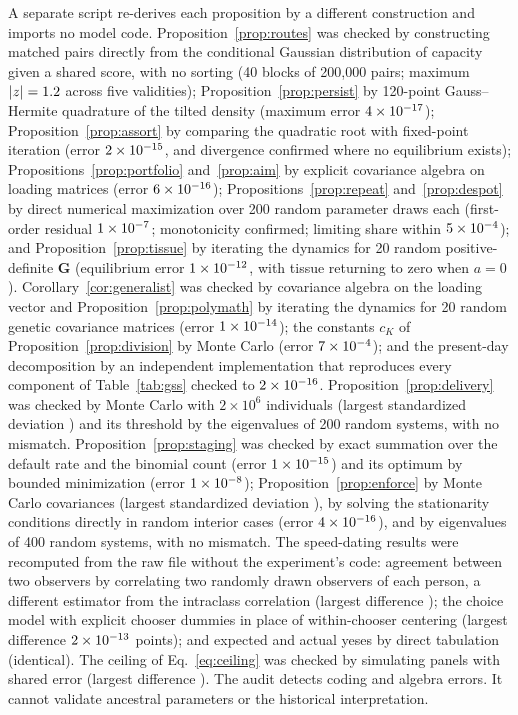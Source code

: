 A separate script re-derives each proposition by a different construction and imports no model code.
Proposition~\ref{prop:routes} was checked by constructing matched pairs directly from the conditional Gaussian distribution of
capacity given a shared score, with no sorting (40 blocks of 200,000 pairs; maximum $|z|=1.2$ across five validities);
Proposition~\ref{prop:persist} by 120-point Gauss--Hermite quadrature of the tilted density (maximum error $4\times10^{-17}$);
Proposition~\ref{prop:assort} by comparing the quadratic root with fixed-point iteration (error $2\times10^{-15}$, and divergence
confirmed where no equilibrium exists); Propositions~\ref{prop:portfolio} and~\ref{prop:aim} by explicit covariance algebra on
loading matrices (error $6\times10^{-16}$); Propositions~\ref{prop:repeat} and~\ref{prop:despot} by direct numerical maximization over
200 random parameter draws each (first-order residual $1\times10^{-7}$; monotonicity confirmed; limiting share within $5\times10^{-4}$);
and Proposition~\ref{prop:tissue} by iterating the dynamics for 20 random positive-definite $\mathbf G$ (equilibrium error
$1\times10^{-12}$, with tissue returning to zero when $a=0$). Corollary~\ref{cor:generalist} was checked by covariance algebra on
the loading vector and Proposition~\ref{prop:polymath} by iterating the dynamics for 20 random genetic covariance matrices
(error $1\times10^{-14}$); the constants $c_K$ of Proposition~\ref{prop:division} by Monte Carlo (error $7\times10^{-4}$); and the
present-day decomposition by an independent implementation that reproduces every component of Table~\ref{tab:gss} checked to
$2\times10^{-16}$. Proposition~\ref{prop:delivery} was checked by Monte Carlo with $2\times10^6$ individuals (largest standardized
deviation \AudDelZ) and its threshold by the eigenvalues of 200 random systems, with no mismatch.
Proposition~\ref{prop:staging} was checked by exact summation over the default rate and the binomial count (error
$1\times10^{-15}$) and its optimum by bounded minimization (error $1\times10^{-8}$); Proposition~\ref{prop:enforce} by Monte Carlo
covariances (largest standardized deviation \AudEnfZ), by solving the stationarity conditions directly in \AudEnfCases{}
random interior cases (error $4\times10^{-16}$), and by eigenvalues of 400 random systems, with no mismatch. The speed-dating
results were recomputed from the raw file without the experiment's code: agreement between two observers by correlating
two randomly drawn observers of each person, a different estimator from the intraclass correlation (largest difference
\AudSpeedGap); the choice model with explicit chooser dummies in place of within-chooser centering (largest difference
$2\times10^{-13}$ points); and expected and actual yeses by direct tabulation (identical). The ceiling of Eq.~\eqref{eq:ceiling} was checked by
simulating panels with shared error (largest difference \AudCeil). The audit detects coding
and algebra errors. It cannot validate
ancestral parameters or the historical interpretation.


